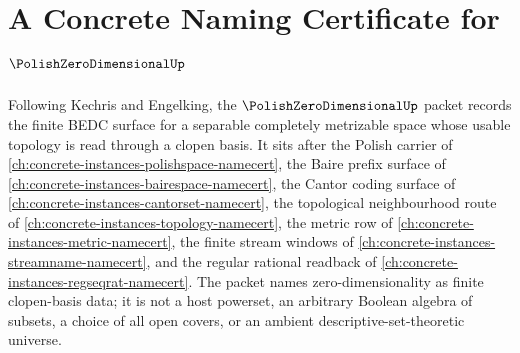 \chapter{A Concrete Naming Certificate for $\PolishZeroDimensionalUp$}
\label{ch:concrete-instances-polish-zero-dimensional-namecert}

Following Kechris and Engelking, the $\PolishZeroDimensionalUp$ packet records the finite BEDC surface for a separable completely metrizable space whose usable topology is read through a clopen basis. It sits after the Polish carrier of \autoref{ch:concrete-instances-polishspace-namecert}, the Baire prefix surface of \autoref{ch:concrete-instances-bairespace-namecert}, the Cantor coding surface of \autoref{ch:concrete-instances-cantorset-namecert}, the topological neighbourhood route of \autoref{ch:concrete-instances-topology-namecert}, the metric row of \autoref{ch:concrete-instances-metric-namecert}, the finite stream windows of \autoref{ch:concrete-instances-streamname-namecert}, and the regular rational readback of \autoref{ch:concrete-instances-regseqrat-namecert}. The packet names zero-dimensionality as finite clopen-basis data; it is not a host powerset, an arbitrary Boolean algebra of subsets, a choice of all open covers, or an ambient descriptive-set-theoretic universe.

